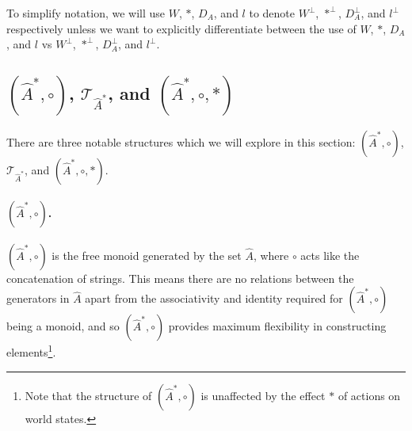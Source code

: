 To simplify notation, we will use $W$, $\ast$, $D_{A}$, and $l$ to denote $W^{\bot}$, $\ast^{\bot}$, $D_{A}^{\bot}$, and $l^{\bot}$ respectively unless we want to explicitly differentiate between the use of $W$, $\ast$, $D_{A}$, and $l$ vs $W^{\bot}$, $\ast^{\bot}$, $D_{A}^{\bot}$, and $l^{\bot}$.


\subsection{$(\hat{A}^{\ast}, \circ)$, $\mathcal{T}_{\hat{A}^{\ast}}$, and $(\hat{A}^{\ast}, \circ, \ast)$}

There are three notable structures which we will explore in this section: $(\hat{A}^{\ast}, \circ)$, $\mathcal{T}_{\hat{A}^{\ast}}$, and $(\hat{A}^{\ast}, \circ, \ast)$.

\paragraph{$(\hat{A}^{\ast}, \circ)$.}
$(\hat{A}^{\ast}, \circ)$ is the free monoid generated by the set $\hat{A}$, where $\circ$ acts like the concatenation of strings.
This means there are no relations between the generators in $\hat{A}$ apart from the associativity and identity required for $(\hat{A}^{\ast}, \circ)$ being a monoid, and so $(\hat{A}^{\ast}, \circ)$ provides maximum flexibility in constructing elements\footnote{Note that the structure of $(\hat{A}^{\ast}, \circ)$ is unaffected by the effect $\ast$ of actions on world states.}.

